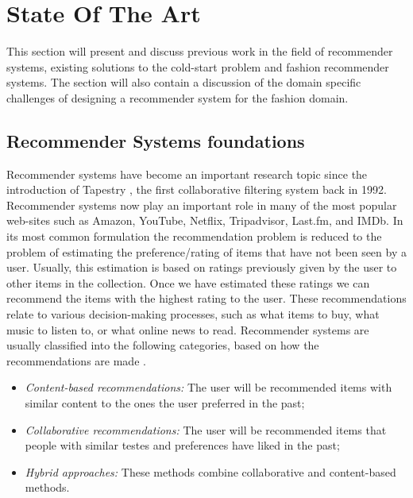 
\section{State Of The Art}
\label{sec:SotA}

This section will present and discuss previous work in the field of recommender
systems, existing solutions to the cold-start problem and fashion recommender
systems. The section will also contain a discussion of the domain specific
challenges of designing a recommender system for the fashion domain.

\subsection{Recommender Systems foundations}



Recommender systems have become an important research topic since the
introduction of Tapestry \cite{Goldberg1992}, the first collaborative filtering
system back in 1992. Recommender systems now play an important role in many of
the most popular web-sites such as Amazon, YouTube, Netflix, Tripadvisor,
Last.fm, and IMDb. In its most common formulation the recommendation problem is
reduced to the problem of estimating the preference/rating of items that have
not been seen by a user. Usually, this estimation is based on ratings
previously given by the user to other items in the collection. Once we have
estimated these ratings we can recommend the items with the highest rating to
the user. These recommendations relate to various decision-making processes,
such as what items to buy, what music to listen to, or what online news to
read. Recommender systems are usually classified into the following categories,
based on how the recommendations are made \cite{Adomavicius2005}.

\begin{itemize}
\item \emph{Content-based recommendations:} The user will be recommended items
with similar content to the ones the user preferred in the past;
\item \emph{Collaborative recommendations:} The user will be recommended items
that people with similar testes and preferences have liked in the past;
\item \emph{Hybrid approaches:} These methods combine collaborative and
content-based methods.

\end{itemize}

